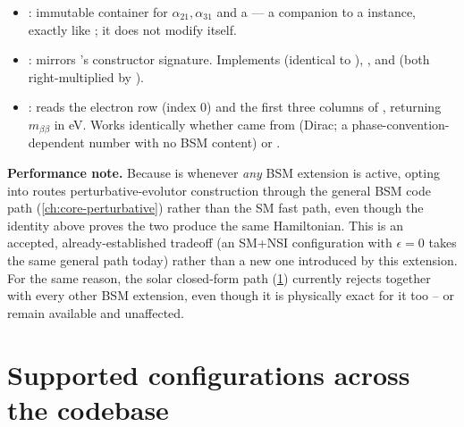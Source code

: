 \begin{implbox}
\begin{itemize}
  \item {}: immutable container for
    $\alpha_{21},\alpha_{31}$ and a  --- a
    companion to a  instance, exactly like
    ; it does not modify 
    itself.
  \item {}: mirrors
    's constructor
    signature. Implements  (identical to
    ), , and 
    (both right-multiplied by ).
  \item {}: reads the electron row (index 0) and the
    first three columns of , returning
    $m_{\beta\beta}$ in eV. Works identically whether 
    came from  (Dirac; a phase-convention-dependent
    number with no BSM content) or .
\end{itemize}
\end{implbox}

\begin{notebox}
\textbf{Performance note.} Because
 is  whenever
\emph{any} BSM extension is active, opting into
 routes perturbative-evolutor
construction through the general BSM code path
(\cref{ch:core-perturbative}) rather than the SM fast path, even though
the identity above proves the two produce the same Hamiltonian. This is an
accepted, already-established tradeoff (an SM+NSI configuration with
$\epsilon=0$ takes the same general path today) rather than a new one
introduced by this extension. For the same reason, the solar
 closed-form path
(\cref{sec:bsm-support-matrix}) currently rejects
 together with every other BSM
extension, even though it is physically exact for it too --
 or  remain
available and unaffected.
\end{notebox}

\section{Supported configurations across the codebase}
\label{sec:bsm-support-matrix}

